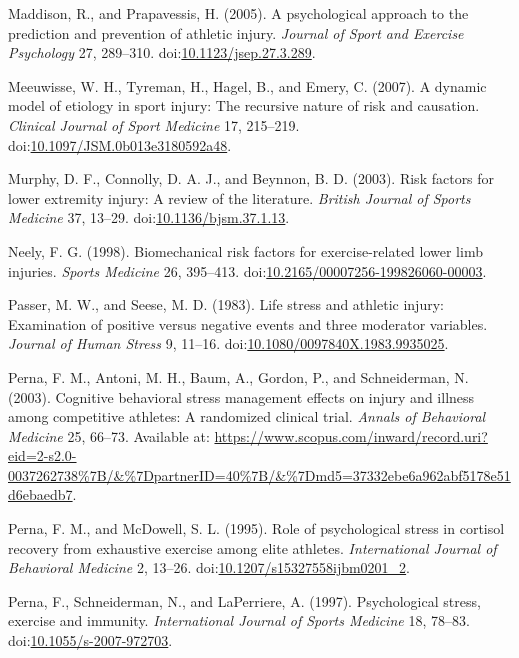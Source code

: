 \documentclass[utf8]{frontiersHLTH}
\begin{document}
\leavevmode\hypertarget{ref-Maddison2005}{}%
Maddison, R., and Prapavessis, H. (2005). A psychological approach to
the prediction and prevention of athletic injury. \emph{Journal of Sport
and Exercise Psychology} 27, 289--310.
doi:\href{https://doi.org/10.1123/jsep.27.3.289}{10.1123/jsep.27.3.289}.

\leavevmode\hypertarget{ref-Meeuwisse2007}{}%
Meeuwisse, W. H., Tyreman, H., Hagel, B., and Emery, C. (2007). A
dynamic model of etiology in sport injury: The recursive nature of risk
and causation. \emph{Clinical Journal of Sport Medicine} 17, 215--219.
doi:\href{https://doi.org/10.1097/JSM.0b013e3180592a48}{10.1097/JSM.0b013e3180592a48}.

\leavevmode\hypertarget{ref-Murphy2003}{}%
Murphy, D. F., Connolly, D. A. J., and Beynnon, B. D. (2003). Risk
factors for lower extremity injury: A review of the literature.
\emph{British Journal of Sports Medicine} 37, 13--29.
doi:\href{https://doi.org/10.1136/bjsm.37.1.13}{10.1136/bjsm.37.1.13}.

\leavevmode\hypertarget{ref-Neely1998}{}%
Neely, F. G. (1998). Biomechanical risk factors for exercise-related
lower limb injuries. \emph{Sports Medicine} 26, 395--413.
doi:\href{https://doi.org/10.2165/00007256-199826060-00003}{10.2165/00007256-199826060-00003}.

\leavevmode\hypertarget{ref-Passer1983a}{}%
Passer, M. W., and Seese, M. D. (1983). Life stress and athletic injury:
Examination of positive versus negative events and three moderator
variables. \emph{Journal of Human Stress} 9, 11--16.
doi:\href{https://doi.org/10.1080/0097840X.1983.9935025}{10.1080/0097840X.1983.9935025}.

\leavevmode\hypertarget{ref-Perna2003}{}%
Perna, F. M., Antoni, M. H., Baum, A., Gordon, P., and Schneiderman, N.
(2003). Cognitive behavioral stress management effects on injury and
illness among competitive athletes: A randomized clinical trial.
\emph{Annals of Behavioral Medicine} 25, 66--73. Available at:
\url{https://www.scopus.com/inward/record.uri?eid=2-s2.0-0037262738\%7B/\&\%7DpartnerID=40\%7B/\&\%7Dmd5=37332ebe6a962abf5178e51d6ebaedb7}.

\leavevmode\hypertarget{ref-Perna1995}{}%
Perna, F. M., and McDowell, S. L. (1995). Role of psychological stress
in cortisol recovery from exhaustive exercise among elite athletes.
\emph{International Journal of Behavioral Medicine} 2, 13--26.
doi:\href{https://doi.org/10.1207/s15327558ijbm0201_2}{10.1207/s15327558ijbm0201\_2}.

\leavevmode\hypertarget{ref-Perna1997}{}%
Perna, F., Schneiderman, N., and LaPerriere, A. (1997). Psychological
stress, exercise and immunity. \emph{International Journal of Sports
Medicine} 18, 78--83.
doi:\href{https://doi.org/10.1055/s-2007-972703}{10.1055/s-2007-972703}.
\end{document}
